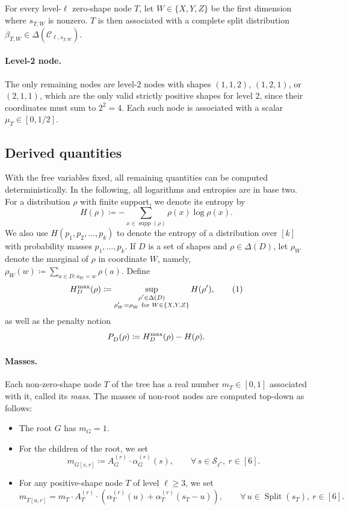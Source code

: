 \documentclass[11pt, a4paper, copyright, gdm]{google}
\theoremstyle{definition}
\theoremstyle{remark}
\theoremstyle{plain}
\DeclareMathOperator{\Split}{Split}
\newcommand{\defn}[1]{{\emph{{#1}}}}
\newcommand{\Shapes}{\mathcal{S}}
\newcommand{\defeq}{\coloneqq}
\DeclareMathOperator{\supp}{supp}
\DeclarePairedDelimiter{\bk}{(}{)}
\newcommand{\numberthis}{\addtocounter{equation}{1}\tag{\theequation}}
\begin{document}
For every level-$\ell$ zero-shape node $T$, let $W \in \{X, Y, Z\}$ be the first dimension where $s_{T,W}^{}$ is nonzero. $T$ is then associated with a complete split distribution $\beta_{T,W}^{} \in \Delta(\mathcal C_{\ell, s_{T,W}^{}}^{})$.

\paragraph{Level-2 node.}
The only remaining  nodes are level-2 nodes with shapes $(1,1,2)$, $(1,2,1)$, or $(2,1,1)$, which are the only valid strictly positive shapes for level 2, since their coordinates must sum to $2^2=4$. Each such node is associated with a scalar $\mu_{T}^{} \in [0, 1/2]$.


\subsection{Derived quantities}
\label{subsec:derived-quantities}

With the free variables fixed, all remaining quantities can be computed deterministically.
In the following, all logarithms and entropies are in base two.  For a distribution $\rho$ with finite support, we denote its entropy by
\[
  H(\rho) \defeq -\sum_{x\in\supp(\rho)}\rho(x) \log \rho(x).
\]
We also use $H(p_1, p_2, \dots, p_k)$ to denote the entropy of a distribution over $[k]$ with probability masses $p_1, \dots, p_k$.
If $D$ is a set of shapes and $\rho \in \Delta(D)$, let $\rho_W^{}$ denote the marginal of $\rho$ in coordinate $W$, namely, $\rho_W(w) \defeq \displaystyle\sum_{a \in D : a_W = w} \rho(a)$.
Define
\[
  H_D^{\max}(\rho)
  \defeq
  \sup_{\substack{\rho'\in\Delta(D)\\
      \rho'_W=\rho_W^{}\text{ for }W\in\{X,Y,Z\}}}
  H(\rho'),
  \numberthis \label{eq:def-hmax}
\]
as well as the penalty notion
\[
  P_{D}^{}\bk*{\rho}
  \defeq
  H_{D}^{\max}\bk*{\rho}
  - H\bk*{\rho}.
\]

\paragraph{Masses.}
Each non-zero-shape node $T$ of the tree has a real number $m_T^{} \in [0, 1]$ associated with it, called its \defn{mass}. The masses of non-root nodes are computed top-down as follows:
\begin{itemize}
  \item The root $G$ has $m_G^{} = 1$.
  \item For the children of the root, we set
        \[
          m_{G[s,r]}^{} \defeq A_G^{(r)} \cdot \alpha_G^{(r)}(s),
          \qquad \forall\, s \in \Shapes_{\ell^*}^{},\ r \in [6].
        \]
  \item For any positive-shape node $T$ of level $\ell \ge 3$, we set
        \[
          m_{T[u,r]}^{}=m_T^{} \cdot A_T^{(r)} \cdot \left(\alpha_T^{(r)}(u)+\alpha_T^{(r)}(s_T^{} \!-\! u)\right),
          \qquad \forall\, u \in \Split(s_T^{}),\ r \in [6].
        \]
\end{itemize}
\end{document}
